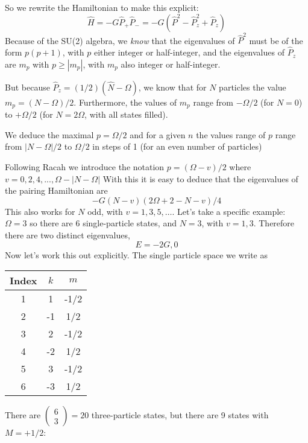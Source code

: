 \begin{small}
{\smallskip
So we rewrite the Hamiltonian to make this explicit:
\[
\hat{H} = -G \hat{P}_+ \hat{P}_- 
= -G \left( \hat{P}^2 - \hat{P}_z^2 + \hat{P}_z\right)
\]
Because of the SU(2) algebra, we \textit{know} that the eigenvalues of 
$\hat{P}^2$ must be of the form $p(p+1)$, with $p$ either integer or half-integer, and the eigenvalues of $\hat{P}_z$ 
are $m_p$ with $p \geq | m_p|$, with $m_p$ also integer or half-integer. 

\bigskip

But because $\hat{P}_z = (1/2)(\hat{N}-\Omega)$, we know that for $N$ particles 
the value $m_p = (N-\Omega)/2$. Furthermore, the values of $m_p$ range from 
$-\Omega/2$ (for $N=0$) to $+\Omega/2$ (for $N=2\Omega$, with all states filled). 

\smallskip

We deduce the maximal $p = \Omega/2$ and for a given $n$ the 
values range of $p$ range from $|N-\Omega|/2$ to $\Omega/2$ in steps of 1 
(for an even number of particles) 

\smallskip

Following Racah we introduce the notation
$p = (\Omega - v)/2$
where $v = 0, 2, 4,..., \Omega - |N-\Omega|$ 
With this it is easy to deduce that the eigenvalues of the pairing Hamiltonian are
\[
-G(N-v)(2\Omega +2-N-v)/4
\]
This also works for $N$ odd, with $v= 1,3,5, \dots$.
Let's take a specific example: $\Omega = 3$ so there are 6 single-particle states, 
and $N = 3$, with $v= 1,3$. Therefore there are two distinct eigenvalues, 
\[
E = -2G, 0
\]
Now let's work this out explicitly. The single particle space we write as 
\begin{center}
\begin{tabular}{|c| c| c|} \hline
Index & $k$ & $m$ \\ \hline
1 & 1 & -1/2 \\
2 & -1 & 1/2 \\
3 & 2 & -1/2 \\
4 & -2 & 1/2 \\
5 & 3 & -1/2 \\
6 & -3 & 1/2 \\ \hline
\end{tabular}
\end{center}


 There are  $\left( 
\begin{array}{c}6 \\ 3 \end{array} \right) = 20$ three-particle states, but there 
are 9 states with $M = +1/2$:

}
\end{small}
